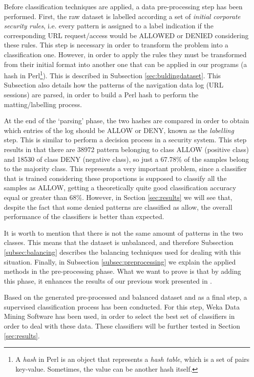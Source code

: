 \documentclass{llncs}
\begin{document}
\noindent Before classification techniques are applied, a data pre-processing step has been performed. First, the raw dataset is labelled according a set of \textit{initial corporate security rules}, i.e. every pattern is assigned to a label indication if the corresponding URL request/access would be ALLOWED or DENIED considering these rules. This step is necessary in order to transform the problem into a classification one. However, in order to apply the rules they must be transformed from their initial format into another one that can be applied in our programs (a hash in Perl\footnote{A \textit{hash} in Perl is an object that represents a \textit{hash table}, which is a set of pairs key-value. Sometimes, the value can be another hash itself.}). This is described in Subsection \ref{sec:buldingdataset}. This Subsection also details how the patterns of the navigation data log (URL sessions) are parsed, in order to build a Perl hash to perform the matting/labelling process.

At the end of the `parsing' phase, the two hashes are compared in order to obtain which entries of the log should be ALLOW or DENY, known as the \textit{labelling} step. This is similar to perform a decision process in a security system. This step results in that there are 38972 pattern belonging to class ALLOW (positive class) and 18530 of class DENY (negative class), so just a 67.78\% of the samples belong to the majority class. This represents a very important problem, since a classifier that is trained considering these proportions is supposed to classify all the samples as ALLOW, getting a theoretically quite good classification accuracy equal or greater than 68\%. However, in Section \ref{sec:results} we will see that, despite the fact that some denied patterns are classified as allow, the overall performance of the classifiers is better than expected.

It is worth to mention that there is not the same amount of patterns in the two classes. This means that the dataset is unbalanced, and therefore Subsection \ref{subsec:balancing} describes the balancing techniques used for dealing with this situation. Finally, in Subsection \ref{subsec:preprocessing} we explain the applied methods in the pre-processing phase. What we want to prove is that by adding this phase, it enhances the results of our previous work presented in \cite{ECTA}.

Based on the generated pre-processed and balanced dataset and as a final step, a supervised classification process \cite{classification_67} has been conducted. For this step, Weka Data Mining Software\cite{weka:site} has been used, in order to select the best set of classifiers in order to deal with these data. These classifiers will be further tested in Section \ref{sec:results}.
\end{document}
